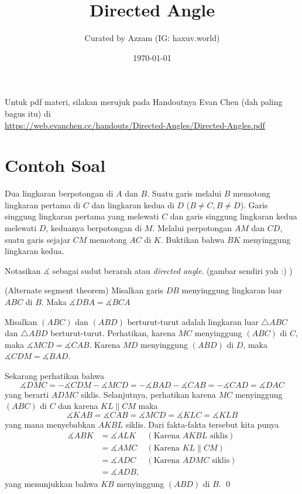 \documentclass[12pt]{scrartcl}
\title{Directed Angle}
\author{Curated by Azzam (IG: haxuv.world)}
\date{\today}
\begin{document}
	\maketitle

\renewcommand*\contentsname{Daftar Isi}
\tableofcontents

\newpage
    Untuk pdf materi, silakan merujuk pada Handoutnya Evan Chen (dah paling bagus itu) di \\\url{https://web.evanchen.cc/handouts/Directed-Angles/Directed-Angles.pdf}
    \section{Contoh Soal}
    Dua lingkaran berpotongan di $A$ dan $B$. Suatu garis melalui $B$ memotong lingkaran pertama di $C$ dan lingkaran kedua di $D$ ($B \neq C, B \neq D$).  Garis singgung lingkaran pertama yang melewati $C$ dan garis singgung lingkaran kedua melewati $D$, keduanya berpotongan di $M$. Melalui perpotongan $AM$ dan $CD$, suatu garis sejajar $CM$ memotong $AC$ di $K$. Buktikan bahwa $BK$ menyinggung lingkaran kedua.
    \vspace{0.2cm}
    \begin{solusi}
        Notasikan $\measuredangle$ sebagai sudut berarah atau \textit{directed angle}. (gambar sendiri yah :) )
		
		\begin{lemma}
		(Alternate segment theorem) Misalkan garis $DB$ menyinggung lingkaran luar $ABC$ di $B$. Maka $\measuredangle DBA = \measuredangle BCA$
		\end{lemma}
		Misalkan $(ABC)$ dan $(ABD)$ berturut-turut adalah lingkaran luar $\triangle ABC$ dan $\triangle ABD$ berturut-turut. Perhatikan, karena $MC$ menyinggung $(ABC)$ di $C$, maka $\measuredangle MCD = \measuredangle CAB$. Karena $MD$ menyinggung $(ABD)$ di $D$, maka $\measuredangle CDM = \measuredangle BAD$.
		
		Sekarang perhatikan bahwa $$\measuredangle DMC = -\measuredangle CDM -\measuredangle MCD = -\measuredangle BAD -\measuredangle CAB = -\measuredangle CAD = \measuredangle DAC$$ yang berarti $ADMC$ siklis. Selanjutnya, perhatikan karena $MC$ menyinggung $(ABC)$ di $C$ dan karena $KL \parallel CM$ maka $$\measuredangle KAB = \measuredangle CAB = \measuredangle MCD = \measuredangle KLC = \measuredangle KLB$$ yang mana menyebabkan $AKBL$ siklis.
		Dari fakta-fakta tersebut kita punya 
		\begin{align*}
		\measuredangle ABK &= \measuredangle ALK & (\text{Karena }AKBL \text{ siklis})\\
		&= \measuredangle AMC & (\text{Karena }KL \parallel CM)\\
		&= \measuredangle ADC & (\text{Karena }ADMC \text{ siklis})\\
		&= \measuredangle ADB,
		\end{align*}yang menunjukkan bahwa $KB$ menyinggung $(ABD)$ di $B$. \qed
    \end{solusi}
\end{document}
